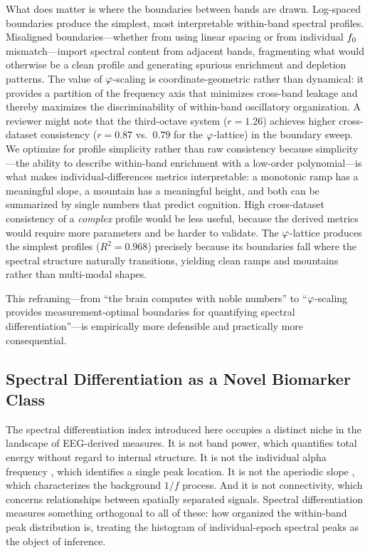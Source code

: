 What does matter is where the boundaries between bands are drawn. Log-spaced boundaries produce the simplest, most interpretable within-band spectral profiles. Misaligned boundaries---whether from using linear spacing or from individual $f_0$ mismatch---import spectral content from adjacent bands, fragmenting what would otherwise be a clean profile and generating spurious enrichment and depletion patterns. The value of $\varphi$-scaling is coordinate-geometric rather than dynamical: it provides a partition of the frequency axis that minimizes cross-band leakage and thereby maximizes the discriminability of within-band oscillatory organization. A reviewer might note that the third-octave system ($r = 1.26$) achieves higher cross-dataset consistency ($r = 0.87$ vs.\ $0.79$ for the $\varphi$-lattice) in the boundary sweep. We optimize for profile simplicity rather than raw consistency because simplicity---the ability to describe within-band enrichment with a low-order polynomial---is what makes individual-differences metrics interpretable: a monotonic ramp has a meaningful slope, a mountain has a meaningful height, and both can be summarized by single numbers that predict cognition. High cross-dataset consistency of a \emph{complex} profile would be less useful, because the derived metrics would require more parameters and be harder to validate. The $\varphi$-lattice produces the simplest profiles ($R^2 = 0.968$) precisely because its boundaries fall where the spectral structure naturally transitions, yielding clean ramps and mountains rather than multi-modal shapes.

This reframing---from ``the brain computes with noble numbers'' to ``$\varphi$-scaling provides measurement-optimal boundaries for quantifying spectral differentiation''---is empirically more defensible and practically more consequential.

\subsection{Spectral Differentiation as a Novel Biomarker Class}

The spectral differentiation index introduced here occupies a distinct niche in the landscape of EEG-derived measures. It is not band power, which quantifies total energy without regard to internal structure. It is not the individual alpha frequency \parencite{klimesch1999eeg,grandy2013iaf,corcoran2018iaf}, which identifies a single peak location. It is not the aperiodic slope \parencite{donoghue2020fooof,voytek2015aperiodic}, which characterizes the background $1/f$ process. And it is not connectivity, which concerns relationships between spatially separated signals. Spectral differentiation measures something orthogonal to all of these: how organized the within-band peak distribution is, treating the histogram of individual-epoch spectral peaks as the object of inference.

